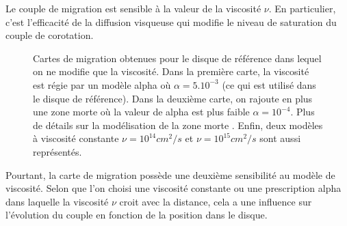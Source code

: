 
Le couple de migration est sensible à la valeur de la viscosité $\nu$. En particulier, c'est l'efficacité de la diffusion visqueuse qui modifie le niveau de saturation du couple de corotation. 

\begin{figure}[htb]
\centering
{}\hfill
{}

\hfill
{}
\caption{Cartes de migration obtenues pour le disque de référence \protect{} dans lequel on ne modifie que la viscosité. Dans la première carte, la viscosité est régie par un modèle alpha où $\alpha=5.10^{-3}$ (ce qui est utilisé dans le disque de référence). Dans la deuxième carte, on rajoute en plus une zone morte où la valeur de alpha est plus faible $\alpha=10^{-4}$. Plus de détails sur la modélisation de la zone morte \protect{}. Enfin, deux modèles à viscosité constante $\nu=10^{14}\unit{cm^2/s}$ et $\nu=10^{15}\unit{cm^2/s}$ sont aussi représentés.}
\end{figure}\label{fig:viscosity_comparison}

Pourtant, la carte de migration possède une deuxième sensibilité au modèle de viscosité. Selon que l'on choisi une viscosité constante ou une prescription alpha dans laquelle la viscosité $\nu$ croit avec la distance, cela a une influence sur l'évolution du couple en fonction de la position dans le disque. 


